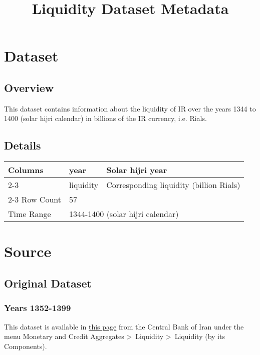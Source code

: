 \documentclass[fleqn]{report}
\begin{document}
\pagestyle{fancy}
\fancyhf{}

\title{Liquidity Dataset Metadata}
\date{}
\maketitle

\newpage

\chapter*{Dataset}
\section*{Overview}
This dataset contains information about the liquidity of IR over the years 1344 to 1400 (solar hijri calendar) in billions of the IR currency, i.e. Rials.
\section*{Details}
\begin{center}
    \begin{tabular}{|l|ll|}
        \hline
        \multirow{3}{*}{Columns} & \multicolumn{1}{l|}{year}       & Solar hijri year                             \\ \cline{2-3} 
                                 & \multicolumn{1}{l|}{liquidity}  & Corresponding liquidity (billion Rials)      \\ \cline{2-3} \hline
        Row Count                & \multicolumn{2}{l|}{57}                                                        \\ \hline
        Time Range               & \multicolumn{2}{l|}{1344-1400  (solar hijri calendar)}                         \\ \hline
    \end{tabular}
\end{center}

\chapter*{Source}
\section*{Original Dataset}
\subsection*{Years 1352-1399}
This dataset is available in 
\href{https://tsd.cbi.ir/DisplayEn/Content.aspx}{this page}
 from the Central Bank of Iran under the menu \colorbox{light-gray}{Monetary and Credit Aggregates \textgreater\ Liquidity \textgreater\ Liquidity (by its Components)}.
\end{document}
